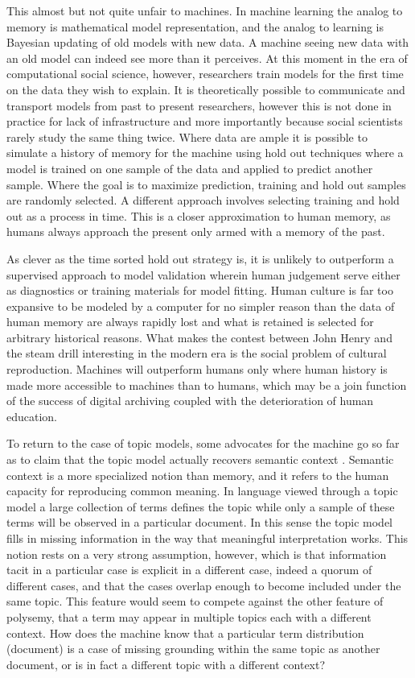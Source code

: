 \documentclass[]{book}
\theoremstyle{definition}
\theoremstyle{definition}
\theoremstyle{definition}
\theoremstyle{remark}
\begin{document}
This almost but not quite unfair to machines. In machine learning the
analog to memory is mathematical model representation, and the analog to
learning is Bayesian updating of old models with new data. A machine
seeing new data with an old model can indeed see more than it perceives.
At this moment in the era of computational social science, however,
researchers train models for the first time on the data they wish to
explain. It is theoretically possible to communicate and transport
models from past to present researchers, however this is not done in
practice for lack of infrastructure and more importantly because social
scientists rarely study the same thing twice. Where data are ample it is
possible to simulate a history of memory for the machine using hold out
techniques where a model is trained on one sample of the data and
applied to predict another sample. Where the goal is to maximize
prediction, training and hold out samples are randomly selected. A
different approach \citep[e.g.~][]{Nay2017Predicting} involves selecting
training and hold out as a process in time. This is a closer
approximation to human memory, as humans always approach the present
only armed with a memory of the past.

As clever as the time sorted hold out strategy is, it is unlikely to
outperform a supervised approach to model validation wherein human
judgement serve either as diagnostics or training materials for model
fitting. Human culture is far too expansive to be modeled by a computer
for no simpler reason than the data of human memory are always rapidly
lost and what is retained is selected for arbitrary historical reasons.
What makes the contest between John Henry and the steam drill
interesting in the modern era is the social problem of cultural
reproduction. Machines will outperform humans only where human history
is made more accessible to machines than to humans, which may be a join
function of the success of digital archiving coupled with the
deterioration of human education.

To return to the case of topic models, some advocates for the machine go
so far as to claim that the topic model actually recovers semantic
context \citep[578]{DiMaggio2013Exploiting}. Semantic context is a more
specialized notion than memory, and it refers to the human capacity for
reproducing common meaning. In language viewed through a topic model a
large collection of terms defines the topic while only a sample of these
terms will be observed in a particular document. In this sense the topic
model fills in missing information in the way that meaningful
interpretation works. This notion rests on a very strong assumption,
however, which is that information tacit in a particular case is
explicit in a different case, indeed a quorum of different cases, and
that the cases overlap enough to become included under the same topic.
This feature would seem to compete against the other feature of
polysemy, that a term may appear in multiple topics each with a
different context. How does the machine know that a particular term
distribution (document) is a case of missing grounding within the same
topic as another document, or is in fact a different topic with a
different context?
\end{document}
